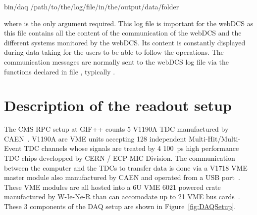 	\begin{bashcode}
 bin/daq /path/to/the/log/file/in/the/output/data/folder
	\end{bashcode}
\vspace{5mm}
	where  is the only argument required. This log file is important for the webDCS as this file contains all the content of the communication of the webDCS and the different systems monitored by the webDCS. Its content is constantly displayed during data taking for the users to be able to follow the operations. The communication messages are normally sent to the webDCS log file via the functions declared in file , typically .\\

\section{Description of the readout setup}
\label{app1:sec:setup}

    The CMS RPC setup at GIF++ counts 5 V1190A \acf{TDC} manufactured by CAEN~\cite{V1190AMUT}. V1190A are VME units accepting 128 independent Multi-Hit/Multi-Event TDC channels whose signals are treated by 4 \SI{100}{ps} high performance TDC chips developped by CERN / ECP-MIC Division. The communication between the computer and the TDCs to transfer data is done via a V1718 VME master module also manufactured by CAEN and operated from a USB port~\cite{V1718MUT}. These VME modules are all hosted into a 6U VME 6021 powered crate manufactured by W-Ie-Ne-R than can accomodate up to 21 VME bus cards~\cite{6U6000MUT}. These 3 components of the DAQ setup are shown in Figure~\ref{fig:DAQSetup}.\\
    
